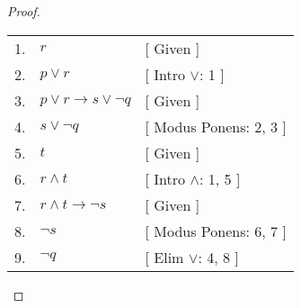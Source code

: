 \begin{proof} \hfill\par
    \begin{tabular}{rll}
        1. & \( r \) & [ Given ] \\
        2. & \( p \lor r \) & [ Intro \(\lor\): 1 ] \\
        3. & \( p \lor r \to s \lor \neg q \) & [ Given ] \\
        4. & \( s \lor \neg q \) & [ Modus Ponens: 2, 3 ] \\
        5. & \( t \) & [ Given ] \\
        6. & \( r \land t \) & [ Intro \(\land\): 1, 5 ] \\
        7. & \( r \land t \to \neg s \) & [ Given ] \\
        8. & \( \neg s \) & [ Modus Ponens: 6, 7 ] \\
        9. & \( \neg q \) & [ Elim \(\lor\): 4, 8 ] \\
    \end{tabular} \par
\end{proof}
